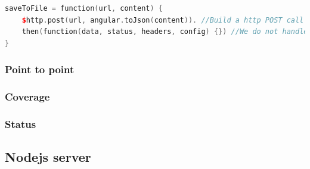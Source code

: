 \begin{lstlisting}[caption = {saveToFile function in editParam.js}, captionpos=b, label={lst:savetofile}, language=C++,firstnumber=1]
saveToFile = function(url, content) {
	$http.post(url, angular.toJson(content)). //Build a http POST call with the url and content
	then(function(data, status, headers, config) {}) //We do not handle errors atm.
}
\end{lstlisting}



\subsubsection{Point to point}

\subsubsection{Coverage}

\subsubsection{Status}

\subsection{Nodejs server}
\label{sec:nodejs_server}
